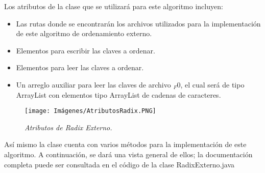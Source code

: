 \documentclass[letterpaper,12pt]{extarticle}
\begin{document}
\noindent Los atributos de la clase que se utilizará para este algoritmo incluyen:

\begin{itemize}

   \item Las rutas donde se encontrarán los archivos utilizados para la implementación de este algoritmo de ordenamiento externo.
   
   \item Elementos para escribir las claves a ordenar.
   
   \item Elementos para leer las claves a ordenar.
   
   \item Un arreglo auxiliar para leer las claves de archivo $_F{0}$, el cual será de tipo ArrayList con elementos tipo ArrayList de cadenas de caracteres.
   
\end{itemize}

\begin{figure}[h!]
\centering
\texttt{[image: Imágenes/AtributosRadix.PNG]}
\caption{\textit{Atributos de Radix Externo.}}
\label{fig:RadN1}
\end{figure}

Así mismo la clase cuenta con varios métodos para la implementación de este algoritmo. A continuación, se dará una vista general de ellos; la documentación completa puede ser consultada en el código de la clase RadixExterno.java
\end{document}
